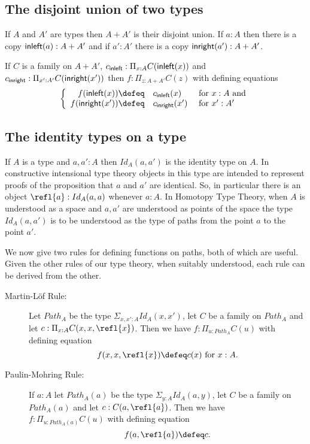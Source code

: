 {\subsection{The disjoint union of two types}

If $A$ and $A'$ are types then $A+A'$ is their disjoint union.  If $a:A$ then there is a copy ${\sf inleft}(a):A+A'$ and if $a':A'$ there is a copy ${\sf inright}(a'):A+A'$.

If $C$ is a family on $A+A'$, $c_{\sf inleft}:\Pi_{x:A}C({\sf inleft}(x))$ and $c_{\sf inright}:\Pi_{x':A'}C({\sf inright}(x'))$ then $f:\Pi_{z:A+A'}C(z)$ with defining equations
  \[\left\{\begin{array}{rll} 
f(\inleft(x))\defeq& c_\inleft(x)&\mbox{ for } x:A \mbox{ and}\\
f(\inright(x'))\defeq& c_\inright(x')&\mbox{ for } x':A'\\
\end{array}\right.\]





\subsection{The identity types on a type}
If $A$ is a type and $a,a':A$ then $Id_A(a,a')$ is the identity type on $A$.  
In constructive intensional type theory objects in this type are intended to represent proofs of the proposition that $a$ and $a'$ are identical.  So, in particular there is an object $\refl{a}:Id_A(a,a)$ whenever $a:A$.  In Homotopy Type Theory, when $A$ is understood as a space and $a,a'$ are understood as points of the space the type $Id_A(a,a')$ is to be understood as the type of paths from the point $a$ to the point $a'$.

We now give two rules for defining functions on paths, both of which are useful.  Given the other rules of our type theory, when suitably understood, each rule can be derived from the other. 

\begin{description}
\item[Martin-L\"{o}f Rule:] Let $Path_A$ be the type $\Sigma_{x,x':A}Id_A(x,x')$, let $C$ be a family on $Path_A$ and let $c:\Pi_{x:A}C(x,x,\refl{x})$.  Then we have $f:\Pi_{u:Path_A}C(u)$ with defining equation
  \[ f(x,x,\refl{x})\defeq c(x)\mbox{ for } x:A.\]
\item[Paulin-Mohring Rule:] If $a:A$ let $Path_A(a)$ be the type $\Sigma_{y:A}Id_A(a,y)$, let $C$ be a family on $Path_A(a)$ and let $c:C(a,\refl{a})$. Then we have\\ $f:\Pi_{u:Path_A(a)}C(u)$ with defining equation
    \[ f(a,\refl{a})\defeq c.\]
\end{description}

}
